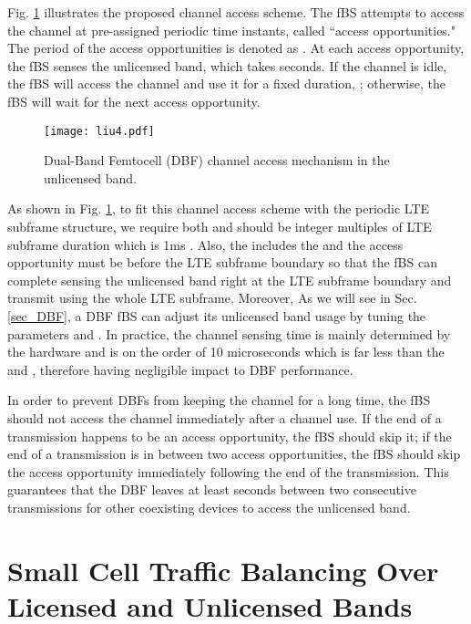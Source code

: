 \documentclass[journal,final,letterpaper,10pt,doublecolumn,twoside]{IEEEtran}
\begin{document}
Fig. \ref{fig_channel_access} illustrates the proposed channel
access scheme. The fBS attempts to access the channel at
pre-assigned periodic time instants, called ``access opportunities."
The period of the access opportunities is denoted as
. At each access opportunity,
the fBS senses the unlicensed band, which takes  seconds.
If the channel is idle, the fBS
will access the channel and use it for a fixed duration,
; otherwise, the fBS will wait for the next
access opportunity.


\begin{figure}
  \center
  \texttt{[image: liu4.pdf]}
  \caption{Dual-Band Femtocell (DBF) channel access mechanism in the unlicensed band.} \label{fig_channel_access}
\end{figure}



As shown in Fig. \ref{fig_channel_access}, to fit this channel access scheme with the periodic LTE subframe structure, we require both  and  should be integer multiples of LTE subframe duration which is 1ms \cite{LTE-A}. Also, the  includes the  and the access opportunity must be  before the LTE subframe boundary so that the fBS
can complete sensing the unlicensed band right at the LTE subframe boundary and transmit using the whole LTE subframe.   Moreover,
As we will see in Sec. \ref{sec_DBF}, a DBF fBS
can adjust its unlicensed band usage by tuning the
parameters  and .
In practice, the channel sensing time   is mainly determined by the hardware and is on the order of
10 microseconds \cite{802.11-2007}  which is far less than the  and , therefore having negligible impact to DBF performance.

In order to prevent DBFs from keeping the channel for a long time,
the fBS should not access the channel immediately after a channel
use. If the end of a transmission happens to be an access
opportunity, the fBS should skip it; if the end of a
transmission is in between two access opportunities, the fBS should skip
the access opportunity immediately following the end of the transmission. This guarantees that
the DBF leaves at least  seconds between
two consecutive transmissions for other coexisting devices to access the
unlicensed band.










\section{Small Cell Traffic Balancing Over Licensed and Unlicensed Bands}\label{sec:DL-assignment}
\end{document}
